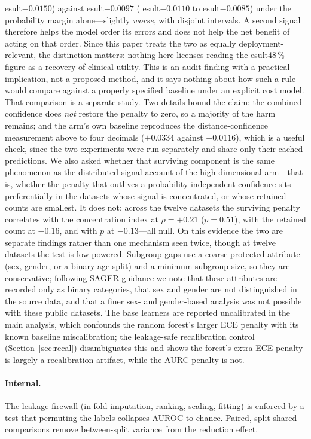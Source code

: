 \documentclass[fleqn,10pt]{wlscirep}
\newcommand{\result}[1]{#1}
\begin{document}
esult{$-0.0150$}) against 
esult{$-0.0097$} (
esult{$-0.0110$} to 
esult{$-0.0085$}) under the
probability margin alone---slightly \emph{worse}, with disjoint intervals. A second signal therefore
helps the model order its errors and does not help the net benefit of acting on that order. Since this
paper treats the two as equally deployment-relevant, the distinction matters: nothing here licenses
reading the 
esult{48\,\%} figure as a recovery of clinical utility. This is an audit finding with a
practical implication, not a proposed method, and it says nothing about how such a rule would compare
against a properly specified baseline under an explicit cost model. That comparison is a separate
study. Two details bound the claim: the combined confidence does \emph{not} restore the
penalty to zero, so a majority of the harm remains; and the arm's own baseline reproduces the
distance-confidence measurement above to four decimals (\result{$+0.0334$} against \result{$+0.0116$}),
which is a useful check, since the two experiments were run separately and share only their cached
predictions.
 We also asked whether that surviving
component is the same phenomenon as the distributed-signal account of the high-dimensional arm---that
is, whether the penalty that outlives a probability-independent confidence sits preferentially in the
datasets whose signal is concentrated, or whose retained counts are smallest. It does not: across the
twelve datasets the surviving penalty correlates with the concentration index at
$\rho=\result{+0.21}$ ($p=\result{0.51}$), with the retained count at \result{$-0.16$}, and with $p$
at \result{$-0.13$}---all null. On this evidence the two are separate findings rather than one
mechanism seen twice, though at twelve datasets the test is low-powered. Subgroup gaps use a coarse
protected attribute (sex, gender, or a binary age split) and a minimum subgroup size, so they
are conservative; following SAGER guidance we note that these attributes are recorded only as
binary categories, that sex and gender are not distinguished in the source data, and that a finer
sex- and gender-based analysis was not possible with these public datasets. The base learners are reported uncalibrated in the main analysis, which confounds
the random forest's larger ECE penalty with its known baseline miscalibration; the leakage-safe
recalibration control (Section~\ref{sec:recal}) disambiguates this and shows the forest's extra ECE
penalty is largely a recalibration artifact, while the AURC penalty is not.

\paragraph{Internal.} The leakage firewall (in-fold imputation, ranking, scaling, fitting) is
enforced by a test that permuting the labels collapses AUROC to chance. Paired, split-shared
comparisons remove between-split variance from the reduction effect.
\end{document}

